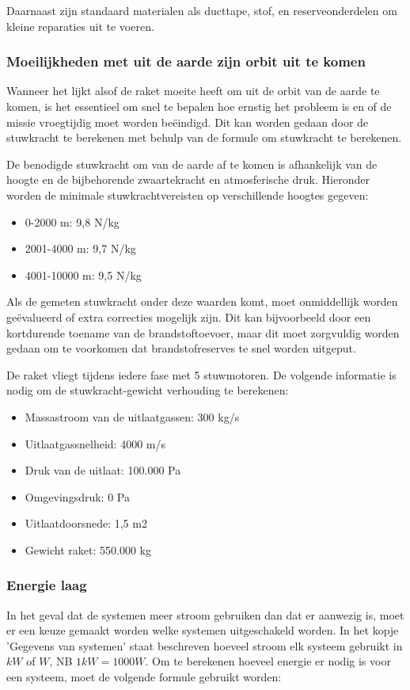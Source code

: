 Daarnaast zijn standaard materialen als ducttape, stof, en reserveonderdelen om kleine reparaties uit te voeren.

\subsubsection{Moeilijkheden met uit de aarde zijn orbit uit te komen}
Wanneer het lijkt alsof de raket moeite heeft om uit de orbit van de aarde te komen, is het essentieel om snel te bepalen hoe ernstig het probleem is en of de missie vroegtijdig moet worden beëindigd. Dit kan worden gedaan door de stuwkracht te berekenen met behulp van de formule om stuwkracht te berekenen.

De benodigde stuwkracht om van de aarde af te komen is afhankelijk van de hoogte en de bijbehorende zwaartekracht en atmosferische druk. Hieronder worden de minimale stuwkrachtvereisten op verschillende hoogtes gegeven:

\begin{itemize}
    \item 0-2000 m: 9,8 N/kg
    \item 2001-4000 m: 9,7 N/kg
    \item 4001-10000 m: 9,5 N/kg
\end{itemize}

Als de gemeten stuwkracht onder deze waarden komt, moet onmiddellijk worden geëvalueerd of extra correcties mogelijk zijn. Dit kan bijvoorbeeld door een kortdurende toename van de brandstoftoevoer, maar dit moet zorgvuldig worden gedaan om te voorkomen dat brandstofreserves te snel worden uitgeput.

De raket vliegt tijdens iedere fase met 5 stuwmotoren. De volgende informatie is nodig om de stuwkracht-gewicht verhouding te berekenen:
\begin{itemize}
    \item Massastroom van de uitlaatgassen: 300 kg/s
    \item Uitlaatgassnelheid: 4000 m/s
    \item Druk van de uitlaat: 100.000 Pa
    \item Omgevingsdruk: 0 Pa
    \item Uitlaatdoorsnede: 1,5 m2
    \item Gewicht raket: 550.000 kg
\end{itemize}

\subsubsection{Energie laag}
In het geval dat de systemen meer stroom gebruiken dan dat er aanwezig is, moet er een keuze gemaakt worden welke systemen uitgeschakeld worden. In het kopje 'Gegevens van systemen' staat beschreven hoeveel stroom elk systeem gebruikt in $kW$ of $W$, NB $1kW=1000W$. Om te berekenen hoeveel energie er nodig is voor een systeem, moet de volgende formule gebruikt worden:

